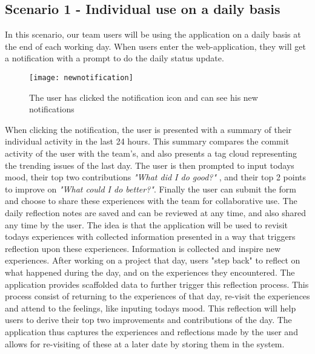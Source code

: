 \subsection{Scenario 1 - Individual use on a daily basis}
\label{scenario1}
In this scenario, our team users will be using the application on a daily basis at the end of each working day.
When users enter the web-application, they will get a notification with a prompt to do the daily status update.

\begin{figure}[h!]
\label{newnotification}
\centering
	\texttt{[image: newnotification]}
\caption{The user has clicked the notification icon and can see his new notifications}
\end{figure}

  When clicking the notification, the user is presented with a summary of their individual activity in the last 24 hours.
  This summary compares the commit activity of the user with the team's, and also presents a tag cloud representing the trending issues of the last day. The user is then prompted to input todays mood, their top two contributions \emph{"What did I do good?"} , and their top 2 points to improve on \emph{"What could I do better?"}. Finally the user can submit the form and choose to share these experiences with the team for collaborative use. The daily reflection notes are saved and can be reviewed at any time, and also shared any time by the user. The idea is that the application will be used to revisit todays experiences with collected information presented in a way that triggers reflection upon these experiences. Information is collected and inspire new experiences. After working on a project that day, users "step back" to reflect on what happened during the day, and on the experiences they encountered. The application provides scaffolded data to further trigger this reflection process. This process consist of returning to the experiences of that day, re-visit the experiences and attend to the feelings, like inputing todays mood. This reflection will help users to derive their top two improvements and contributions of the day\citep{Krogstie2011}. The application thus captures the experiences and reflections made by the user and allows for re-visiting of these at a later date by storing them in the system. 

